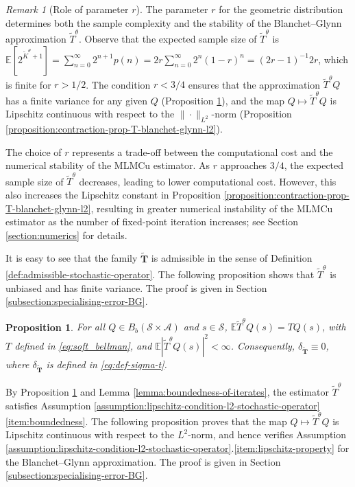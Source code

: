 \documentclass[11pt]{article}
\numberwithin{equation}{section}
\newtheorem{proposition}[theorem]{Proposition}
\theoremstyle{definition}
\theoremstyle{remark}
\newtheorem{remark}{Remark}[section]
\begin{document}
\begin{remark}[Role of parameter $r$]
    \label{remark:r}
   The parameter $ r $ 
   for the geometric distribution 
   determines both the sample complexity and the stability of the Blanchet–Glynn approximation $ \tilde{T}^\theta $.  
   Observe that 
     the expected sample size of $\tilde T^\theta$ is  
    $\mathbb E[2^{\tilde K^\theta+1}]=\sum_{n=0}^\infty 2^{n + 1}p(n) = 2 r \sum_{n=0}^\infty  2^n (1-r)^n = (2r - 1)^{-1}2r$,
    which is finite for $r > 1/2$. 
    The condition $r<3/4$
    ensures that
    the approximation $\tilde T^\theta Q$   has a  finite variance     for any given $Q$ 
    (Proposition \ref{prop:unbiasedness-blanchet-glynn}),
    and the map $Q\mapsto \tilde T^\theta Q$ is Lipschitz  continuous  with respect to the $\|\cdot\|_{L^2}$-norm
    (Proposition \ref{proposition:contraction-prop-T-blanchet-glynn-l2}).

The choice of $ r $ represents a trade-off between the computational cost and the numerical stability of the MLMCu estimator. As $ r $ approaches $ {3}/{4} $, the expected sample size of $ \tilde{T}^\theta $ decreases, leading to lower computational cost. However, this also increases the Lipschitz constant in Proposition \ref{proposition:contraction-prop-T-blanchet-glynn-l2}, resulting in  greater numerical instability of the MLMCu estimator
as the number of fixed-point iteration increases;
see Section \ref{section:numerics} for details.  
    
\end{remark}


It is easy to see that the family 
$\tilde{\mathbf{T}}$  is admissible in  the sense of Definition \ref{def:admissible-stochastic-operator}.
The following proposition shows that 
$\tilde{T}^\theta$ 
is unbiased and 
has finite variance. The proof is given  in Section \ref{subsection:specialising-error-BG}.

\begin{proposition}
        \label{prop:unbiasedness-blanchet-glynn}
  For all $Q \in B_b(\mathcal S \times \mathcal A)$ and   $s \in \mathcal S$, 
  $ \mathbb E \tilde{T}^\theta Q (s) =T Q (s) $, 
  with $T$   defined in \eqref{eq:soft_bellman},
  and 
  $\mathbb E |\tilde{T}^\theta Q (s)|^2 < \infty $. Consequently,
  $\delta_{\tilde{\mathbf T}} \equiv 0$,
 where $\delta_{\tilde{\mathbf T}}$ is defined in \eqref{eq:def-sigma-t}.
\end{proposition}

By Proposition \ref{prop:unbiasedness-blanchet-glynn} and Lemma \ref{lemma:boundedness-of-iterates}, 
the estimator $\tilde T^\theta$ satisfies  Assumption \ref{assumption:lipschitz-condition-l2-stochastic-operator}\ref{item:boundedness}.
The following proposition  proves  that the 
map  
$Q\mapsto \tilde T^\theta Q$
is Lipschitz continuous with respect to the $L^2$-norm,
and hence verifies 
Assumption \ref{assumption:lipschitz-condition-l2-stochastic-operator}.\ref{item:lipschitz-property}
for the Blanchet–Glynn approximation. 
The proof is given in Section \ref{subsection:specialising-error-BG}.
 
\end{document}
